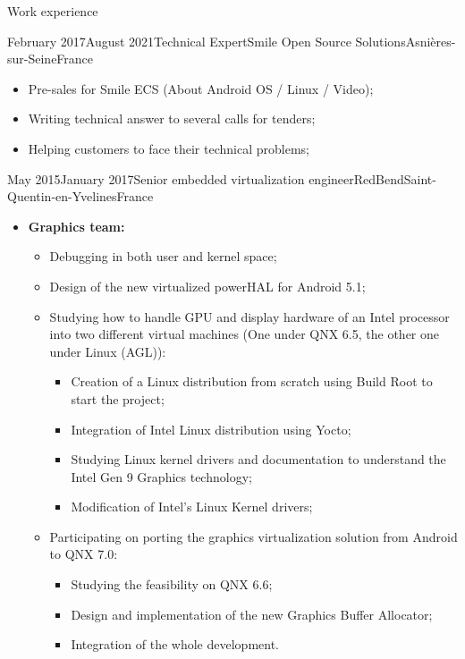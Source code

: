 \documentclass[a4paper, 10pt]{article}
\begin{document}
\begin{section} {Work experience}
\begin{experience}{February 2017}{August 2021}{Technical Expert}{Smile Open Source Solutions}{Asni\`{e}res-sur-Seine}{France}
\begin{subexperience}
\begin{itemize}[parsep=0cm,itemsep=0cm,topsep=0cm]
\begin{itemize}[parsep=0cm,itemsep=0cm,topsep=0cm]
			\item Pre-sales for Smile ECS (About Android OS / Linux / Video);
			\item Writing technical answer to several calls for tenders;
			\item Helping customers to face their technical problems;
		\end{itemize}
	\end{itemize}
	\end{subexperience}
	\end{experience}

    \begin{experience}{May 2015}{January 2017}{Senior embedded virtualization engineer}{RedBend}{Saint-Quentin-en-Yvelines}{France}
	\begin{subexperience}
	    \begin{itemize}[parsep=0cm,itemsep=0cm,topsep=0cm]
		\item \textbf {Graphics team:}
		\begin{itemize}[parsep=0cm,itemsep=0cm,topsep=0cm]
		    \item Debugging in both user and kernel space;
		    \item Design of the new virtualized powerHAL for Android 5.1;
		    \item Studying how to handle GPU and display hardware of an Intel processor into two different virtual machines (One under QNX 6.5, the other one under Linux (AGL)):
		    \begin{itemize}[parsep=0cm,itemsep=0cm,topsep=0cm]
			\item Creation of a Linux distribution from scratch using Build Root to start the project;
			\item Integration of Intel Linux distribution using Yocto;
			\item Studying Linux kernel drivers and documentation to understand the Intel Gen 9 Graphics technology;
			\item Modification of Intel's Linux Kernel drivers;
		    \end{itemize}
		    \item Participating on porting the graphics virtualization solution from Android to QNX 7.0:
		    \begin{itemize}[parsep=0cm,itemsep=0cm,topsep=0cm]
			\item Studying the feasibility on QNX 6.6;
			\item Design and implementation of the new Graphics Buffer Allocator;
			\item Integration of the whole development.
		    \end{itemize}
		\end{itemize}
	    \end{itemize}
	\end{subexperience}
    \end{experience}


\end{section}
\end{document}

